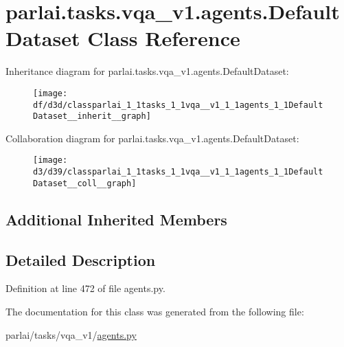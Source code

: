 \hypertarget{classparlai_1_1tasks_1_1vqa__v1_1_1agents_1_1DefaultDataset}{}\section{parlai.\+tasks.\+vqa\+\_\+v1.\+agents.\+Default\+Dataset Class Reference}
\label{classparlai_1_1tasks_1_1vqa__v1_1_1agents_1_1DefaultDataset}


Inheritance diagram for parlai.\+tasks.\+vqa\+\_\+v1.\+agents.\+Default\+Dataset\+:\nopagebreak
\begin{figure}[H]
\begin{center}
\leavevmode
\texttt{[image: df/d3d/classparlai\_1\_1tasks\_1\_1vqa\_\_v1\_1\_1agents\_1\_1DefaultDataset\_\_inherit\_\_graph]}
\end{center}
\end{figure}


Collaboration diagram for parlai.\+tasks.\+vqa\+\_\+v1.\+agents.\+Default\+Dataset\+:\nopagebreak
\begin{figure}[H]
\begin{center}
\leavevmode
\texttt{[image: d3/d39/classparlai\_1\_1tasks\_1\_1vqa\_\_v1\_1\_1agents\_1\_1DefaultDataset\_\_coll\_\_graph]}
\end{center}
\end{figure}
\subsection*{Additional Inherited Members}


\subsection{Detailed Description}


Definition at line 472 of file agents.\+py.



The documentation for this class was generated from the following file\+:\begin{DoxyCompactItemize}
\item 
parlai/tasks/vqa\+\_\+v1/\hyperlink{parlai_2tasks_2vqa__v1_2agents_8py}{agents.\+py}\end{DoxyCompactItemize}
